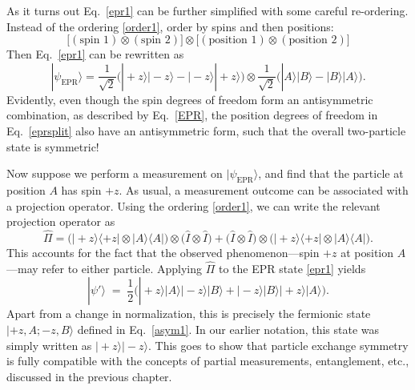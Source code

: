 \documentclass[pra,12pt]{revtex4-2}
\begin{document}
As it turns out Eq.~\eqref{epr1} can be further simplified with some
careful re-ordering.  Instead of the ordering \eqref{order1}, order by
spins and then positions:
\begin{equation}
  \Big[
    (\textrm{spin 1}) \otimes (\textrm{spin 2}) \Big]
  \otimes
  \Big[
    (\textrm{position 1}) \otimes (\textrm{position 2}) \Big]
  \label{order2}
\end{equation}
Then Eq.~\eqref{epr1} can be rewritten as
\begin{equation}
  |\psi_{\mathrm{EPR}}\rangle = \frac{1}{\sqrt{2}} \Big(
  |\!+\!z\rangle |\!-\!z\rangle - |\!-\!z\rangle |\!+\!z\rangle \Big)  
  \otimes \frac{1}{\sqrt{2}} \Big(
  |A\rangle |B\rangle - |B\rangle |A\rangle \Big).
  \label{eprsplit}
\end{equation}
Evidently, even though the spin degrees of freedom form an
antisymmetric combination, as described by Eq.~\eqref{EPR}, the
position degrees of freedom in Eq.~\eqref{eprsplit} also have an
antisymmetric form, such that the overall two-particle state is
symmetric!

Now suppose we perform a measurement on $|\psi_{\mathrm{EPR}}\rangle$,
and find that the particle at position $A$ has spin $+z$.  As usual, a
measurement outcome can be associated with a projection operator.
Using the ordering \eqref{order1}, we can write the relevant
projection operator as
\begin{equation}
  \hat{\Pi} = \Big(|\!+\!z\rangle \langle+z| \otimes |A\rangle \langle A|\Big)
  \otimes\Big( \hat{I} \otimes \hat{I}\Big)
  + \Big(\hat{I} \otimes \hat{I} \Big) \otimes \Big(
  |\!+\!z\rangle \langle+z| \otimes |A\rangle \langle A| \Big).
\end{equation}
This accounts for the fact that the observed phenomenon---spin $+z$ at
position $A$---may refer to either particle.  Applying $\hat{\Pi}$ to
the EPR state \eqref{epr1} yields
\begin{equation}
  |\psi'\rangle \;=\;
  \frac{1}{2} \Big(
    |\!+\!z\rangle|A\rangle |\!-\!z\rangle|B\rangle
    + |\!-\!z\rangle|B\rangle |\!+\!z\rangle|A\rangle \Big).
\end{equation}
Apart from a change in normalization, this is precisely the fermionic
state $|+\!z,A;-z,B\rangle$ defined in Eq.~\eqref{asym1}.  In our
earlier notation, this state was simply written as
$|\!+\!z\rangle|-\!z\rangle$.  This goes to show that particle
exchange symmetry is fully compatible with the concepts of partial
measurements, entanglement, etc., discussed in the previous chapter.
\end{document}

